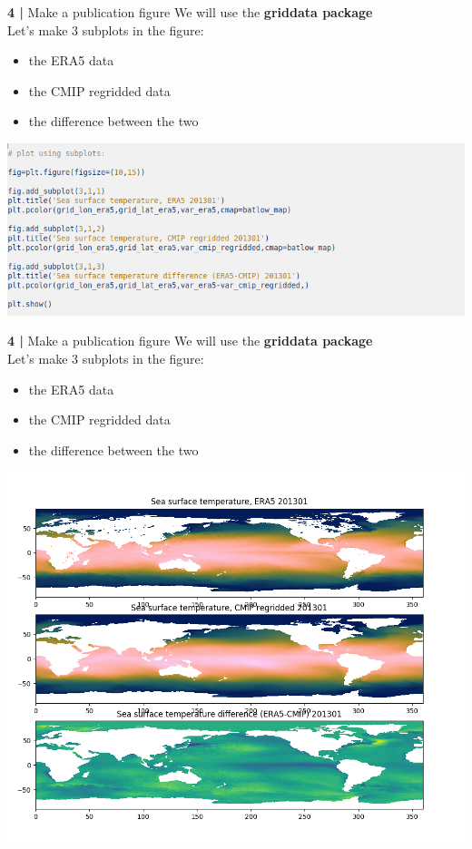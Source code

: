 \begin{frame}{\textbf{4 |} Make a publication figure} 
    We will use the \textbf{griddata package}\\
        \vspace{0.3cm} 
    Let's make 3 subplots in the figure: 
    \begin{itemize}
        \item the ERA5 data
        \item the CMIP regridded data
        \item the difference between the two
    \end{itemize}
    \includegraphics[scale=0.35]{images/Script5_step5.png}
\end{frame}

\begin{frame}{\textbf{4 |} Make a publication figure} 
    We will use the \textbf{griddata package}\\
        \vspace{0.3cm} 
    Let's make 3 subplots in the figure: \\
    \begin{itemize}
        \item the ERA5 data
        \item the CMIP regridded data
        \item the difference between the two
    \end{itemize}
    \includegraphics[scale=0.25]{images/script5_fig2.png}
\end{frame}

